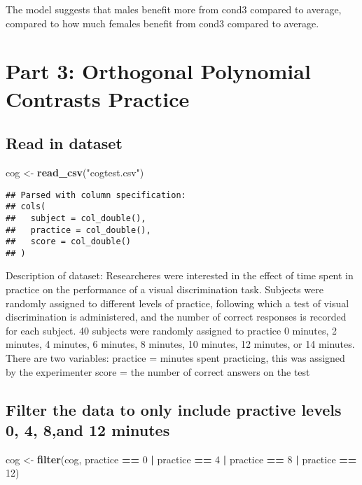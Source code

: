 \documentclass[]{article}
\newenvironment{Shaded}{\begin{snugshade}}{\end{snugshade}}
\newcommand{\KeywordTok}[1]{\textcolor[rgb]{0.13,0.29,0.53}{\textbf{#1}}}
\newcommand{\DecValTok}[1]{\textcolor[rgb]{0.00,0.00,0.81}{#1}}
\newcommand{\StringTok}[1]{\textcolor[rgb]{0.31,0.60,0.02}{#1}}
\newcommand{\OperatorTok}[1]{\textcolor[rgb]{0.81,0.36,0.00}{\textbf{#1}}}
\newcommand{\NormalTok}[1]{#1}
\begin{document}
The model suggests that males benefit more from cond3 compared to
average, compared to how much females benefit from cond3 compared to
average.

\section{Part 3: Orthogonal Polynomial Contrasts
Practice}\label{part-3-orthogonal-polynomial-contrasts-practice}

\subsection{Read in dataset}\label{read-in-dataset-1}

\begin{Shaded}
\begin{Highlighting}[]
\NormalTok{cog <-}\StringTok{ }\KeywordTok{read_csv}\NormalTok{(}\StringTok{"cogtest.csv"}\NormalTok{)}
\end{Highlighting}
\end{Shaded}

\begin{verbatim}
## Parsed with column specification:
## cols(
##   subject = col_double(),
##   practice = col_double(),
##   score = col_double()
## )
\end{verbatim}

Description of dataset: Researcheres were interested in the effect of
time spent in practice on the performance of a visual discrimination
task. Subjects were randomly assigned to different levels of practice,
following which a test of visual discrimination is administered, and the
number of correct responses is recorded for each subject. 40 subjects
were randomly assigned to practice 0 minutes, 2 minutes, 4 minutes, 6
minutes, 8 minutes, 10 minutes, 12 minutes, or 14 minutes. There are two
variables: practice = minutes spent practicing, this was assigned by the
experimenter score = the number of correct answers on the test

\subsection{Filter the data to only include practive levels 0, 4, 8,and
12
minutes}\label{filter-the-data-to-only-include-practive-levels-0-4-8and-12-minutes}

\begin{Shaded}
\begin{Highlighting}[]
\NormalTok{cog <-}\StringTok{ }\KeywordTok{filter}\NormalTok{(cog, practice }\OperatorTok{==}\StringTok{ }\DecValTok{0} \OperatorTok{|}\StringTok{ }\NormalTok{practice }\OperatorTok{==}\StringTok{ }\DecValTok{4} \OperatorTok{|}\StringTok{ }\NormalTok{practice }\OperatorTok{==}\StringTok{ }\DecValTok{8} \OperatorTok{|}\StringTok{ }\NormalTok{practice }\OperatorTok{==}\StringTok{ }\DecValTok{12}\NormalTok{)}
\end{Highlighting}
\end{Shaded}
\end{document}
